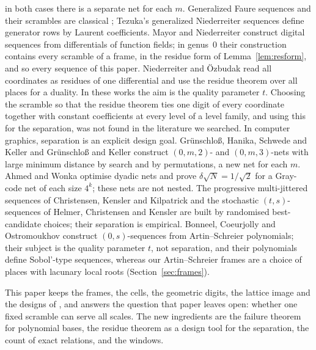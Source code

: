 in both cases there is a separate net for each $m$. Generalized Faure sequences and their scrambles are classical \cite{Fau82,Nie87,Tez93,Tez95,Owe95,Mat98}; Tezuka's generalized Niederreiter sequences \cite{Tez93} define generator rows by Laurent coefficients. Mayor and Niederreiter \cite{MN07} construct digital sequences from differentials of function fields; in genus~$0$ their construction contains every scramble of a frame, in the residue form of Lemma~\ref{lem:resform}, and so every sequence of this paper. Niederreiter and \"Ozbudak \cite{NO07} read all coordinates as residues of one differential and use the residue theorem over all places for a duality. In these works the aim is the quality parameter $t$. Choosing the scramble so that the residue theorem ties one digit of every coordinate together with constant coefficients at every level of a level family, and using this for the separation, was not found in the literature we searched. In computer graphics, separation is an explicit design goal. Gr\"unschlo{\ss}, Hanika, Schwede and Keller \cite{GHSK08} and Gr\"unschlo{\ss} and Keller \cite{GK09} construct $(0,m,2)$- and $(0,m,3)$-nets with large minimum distance by search and by permutations, a new net for each $m$. Ahmed and Wonka \cite{AW21} optimise dyadic nets and prove $\delta\sqrt N=1/\sqrt2$ for a Gray-code net of each size $4^k$; these nets are not nested. The progressive multi-jittered sequences of Christensen, Kensler and Kilpatrick \cite{CKK18} and the stochastic $(t,s)$-sequences of Helmer, Christensen and Kensler \cite{HCK21} are built by randomised best-candidate choices; their separation is empirical. Bonneel, Coeurjolly and Ostromoukhov \cite{BCO26} construct $(0,s)$-sequences from Artin--Schreier polynomials; their subject is the quality parameter $t$, not separation, and their polynomials define Sobol'-type sequences, whereas our Artin--Schreier frames are a choice of places with lacunary local roots (Section~\ref{sec:frames}).

This paper keeps the frames, the cells, the geometric digits, the lattice image and the designs of \cite{Gru26geo}, and answers the question that paper leaves open: whether one fixed scramble can serve all scales. %
The new ingredients are the failure theorem for polynomial bases, the residue theorem as a design tool for the separation, the count of exact relations, and the windows.

